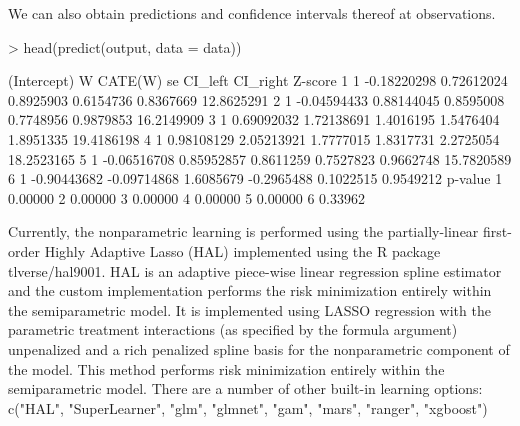 \documentclass{article}
\begin{document}
We can also obtain predictions and confidence intervals thereof at observations.
\begin{Schunk}
\begin{Sinput}
> head(predict(output, data = data))
\end{Sinput}
\begin{Soutput}
  (Intercept)           W     CATE(W)        se    CI_left  CI_right    Z-score
1           1 -0.18220298  0.72612024 0.8925903  0.6154736 0.8367669 12.8625291
2           1 -0.04594433  0.88144045 0.8595008  0.7748956 0.9879853 16.2149909
3           1  0.69092032  1.72138691 1.4016195  1.5476404 1.8951335 19.4186198
4           1  0.98108129  2.05213921 1.7777015  1.8317731 2.2725054 18.2523165
5           1 -0.06516708  0.85952857 0.8611259  0.7527823 0.9662748 15.7820589
6           1 -0.90443682 -0.09714868 1.6085679 -0.2965488 0.1022515  0.9549212
  p-value
1 0.00000
2 0.00000
3 0.00000
4 0.00000
5 0.00000
6 0.33962
\end{Soutput}
\end{Schunk}

Currently, the nonparametric learning is performed using the partially-linear first-order Highly Adaptive Lasso (HAL) implemented using the R package tlverse/hal9001. HAL is an adaptive piece-wise linear regression spline estimator and the custom implementation performs the risk minimization entirely within the semiparametric model. It is implemented using LASSO regression with the parametric treatment interactions (as specified by the formula argument) unpenalized and a rich penalized spline basis for the nonparametric component of the model. This method performs risk minimization entirely within the semiparametric model. There are a number of other built-in learning options: c("HAL", "SuperLearner", "glm", "glmnet", "gam", "mars", "ranger", "xgboost")
\end{document}
